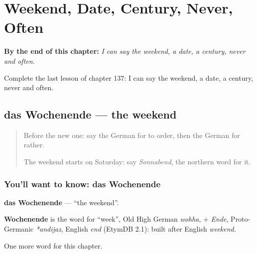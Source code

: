 
\chapter{Weekend, Date, Century, Never, Often}
\label{ch:ge-weekend-date-century-never-often}

\begin{chapteropening}
\textbf{By the end of this chapter:} \emph{I can say the weekend, a date, a century, never and often.}

Complete the last lesson of chapter 137: I can say the weekend, a date, a century, never and often.
\end{chapteropening}

\section[das Wochenende]{das Wochenende — the weekend}

\label{lesson:GE-C137-wochenende}



\begin{quote}
Before the new one: say the German for to order, then the German for rather.

The weekend starts on Saturday: say \emph{Sonnabend}, the northern word for it.
\end{quote}

\subsection*{You'll want to know: das Wochenende}
\textbf{das Wochenende} — \textquotedblleft{}the weekend\textquotedblright{}.

\begin{cousinweb}
\textbf{Wochenende} is the word for \textquotedblleft{}week\textquotedblright{}, Old High German \emph{wohha}, + \emph{Ende}, Proto-Germanic \emph{*andijaz}, English \emph{end} (EtymDB 2.1): built after English \emph{weekend}.
\end{cousinweb}

\begin{grammarlens}[title={What you've built}]
One more word for this chapter.
\end{grammarlens}

